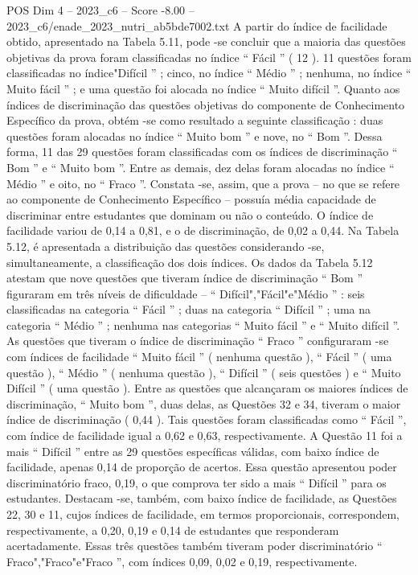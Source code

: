 \begin{textsample}{POS Dim 4 – 2023\_c6 – Score -8.00 – 2023\_c6/enade\_2023\_nutri\_ab5bde7002.txt}
A partir do índice de facilidade obtido, apresentado na Tabela 5.11, pode -se concluir que a maioria das questões objetivas da prova foram classificadas no índice “ Fácil ” ( 12 ). 11 questões foram classificadas no índice"Difícil ” ; cinco, no índice “ Médio ” ; nenhuma, no índice “ Muito fácil ” ; e uma questão foi alocada no índice “ Muito difícil ”.
Quanto aos índices de discriminação das questões objetivas do componente de Conhecimento Específico da prova, obtém -se como resultado a seguinte classificação : duas questões foram alocadas no índice “ Muito bom ” e nove, no “ Bom ”.
Dessa forma, 11 das 29 questões foram classificadas com os índices de discriminação “ Bom ” e “ Muito bom ”.
Entre as demais, dez delas foram alocadas no índice “ Médio ” e oito, no “ Fraco ”.
Constata -se, assim, que a prova – no que se refere ao componente de Conhecimento Específico – possuía média capacidade de discriminar entre estudantes que dominam ou não o conteúdo.
O índice de facilidade variou de 0,14 a 0,81, e o de discriminação, de 0,02 a 0,44.
Na Tabela 5.12, é apresentada a distribuição das questões considerando -se, simultaneamente, a classificação dos dois índices.
Os dados da Tabela 5.12 atestam que nove questões que tiveram índice de discriminação “ Bom ” figuraram em três níveis de dificuldade – “ Difícil","Fácil"e"Médio ” : seis classificadas na categoria “ Fácil ” ; duas na categoria “ Difícil ” ; uma na categoria “ Médio ” ; nenhuma nas categorias “ Muito fácil ” e “ Muito difícil ”.
As questões que tiveram o índice de discriminação “ Fraco ” configuraram -se com índices de facilidade “ Muito fácil ” ( nenhuma questão ), “ Fácil ” ( uma questão ), “ Médio ” ( nenhuma questão ), “ Difícil ” ( seis questões ) e “ Muito Difícil ” ( uma questão ).
Entre as questões que alcançaram os maiores índices de discriminação, “ Muito bom ”, duas delas, as Questões 32 e 34, tiveram o maior índice de discriminação ( 0,44 ).
Tais questões foram classificadas como “ Fácil ”, com índice de facilidade igual a 0,62 e 0,63, respectivamente.
A Questão 11 foi a mais “ Difícil ” entre as 29 questões específicas válidas, com baixo índice de facilidade, apenas 0,14 de proporção de acertos.
Essa questão apresentou poder discriminatório fraco, 0,19, o que comprova ter sido a mais “ Difícil ” para os estudantes.
Destacam -se, também, com baixo índice de facilidade, as Questões 22, 30 e 11, cujos índices de facilidade, em termos proporcionais, correspondem, respectivamente, a 0,20, 0,19 e 0,14 de estudantes que responderam acertadamente.
Essas três questões também tiveram poder discriminatório “ Fraco","Fraco"e"Fraco ”, com índices 0,09, 0,02 e 0,19, respectivamente.

\end{textsample}
